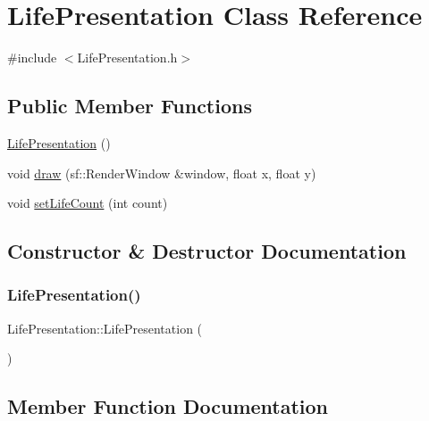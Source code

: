\hypertarget{class_life_presentation}{}\section{Life\+Presentation Class Reference}
\label{class_life_presentation}


{\ttfamily \#include $<$Life\+Presentation.\+h$>$}

\subsection*{Public Member Functions}
\begin{DoxyCompactItemize}
\item 
\hyperlink{class_life_presentation_a120fee1482c0ff49a7113afb86584198}{Life\+Presentation} ()
\item 
void \hyperlink{class_life_presentation_a78c9fdc72d78cb619a885d251996c3ff}{draw} (sf\+::\+Render\+Window \&window, float x, float y)
\item 
void \hyperlink{class_life_presentation_a4baba880082d5281a2fcb6b19d178418}{set\+Life\+Count} (int count)
\end{DoxyCompactItemize}


\subsection{Constructor \& Destructor Documentation}
\mbox{\label{class_life_presentation_a120fee1482c0ff49a7113afb86584198}} 
\subsubsection{\texorpdfstring{Life\+Presentation()}{LifePresentation()}}
{\footnotesize\ttfamily Life\+Presentation\+::\+Life\+Presentation (\begin{DoxyParamCaption}{ }\end{DoxyParamCaption})}



\subsection{Member Function Documentation}
\mbox{\label{class_life_presentation_a78c9fdc72d78cb619a885d251996c3ff}} 
